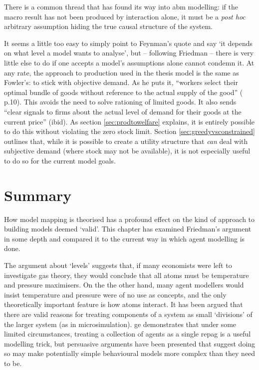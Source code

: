 There is a common thread that has found its way into \gls{abm} modelling: if the macro result has not been produced by interaction alone, it must be a \emph{post hoc} arbitrary assumption hiding the true causal structure of the system. 

It seems a little too easy to simply point to Feynman's quote and say `it depends on what level a model wants to analyse', but – following Friedman – there is very little else to do if one accepts a model's assumptions alone cannot condemn it. At any rate, the approach to production used in the thesis model is the same as Fowler's: to stick with objective demand. As he puts it, ``workers select their optimal bundle of goods without reference to the actual supply of the good'' (\citealt{fowler_finding_2011} p.10). This avoids the need to solve rationing of limited goods. It also sends ``clear signals to firms about the actual level of demand for their goods at the current price'' (ibid). As section \ref{sec:prodtowelfare} explains, it is entirely possible to do this without violating the zero stock limit. Section \ref{sec:greedyvsconstrained} outlines that, while it is possible to create a utility structure that \emph{can} deal with subjective demand (where stock may not be available), it is not especially useful to do so for the current model goals.

\section{Summary \label{sec:abmsummary}}

How model mapping is theorised has a profound effect on the kind of approach to building models deemed `valid'. This chapter has examined Friedman's argument in some depth and compared it to the current way in which agent modelling is done. 

The argument about `levels' suggests that, if many economists were left to investigate gas theory, they would conclude that all atoms must be temperature and pressure maximisers. On the the other hand, many agent modellers would insist temperature and pressure were of no use as concepts, and the only theoretically important feature is how atoms interact. It has been argued that there are valid reasons for treating components of a system as small `divisions' of the larger system (as in microsimulation). \gls{ge} demonstrates that under some limited circumstances, treating a collection of agents as a single \gls{repag} is a useful modelling trick, but persuasive arguments have been presented that suggest doing so may make potentially simple behavioural models more complex than they need to be.

